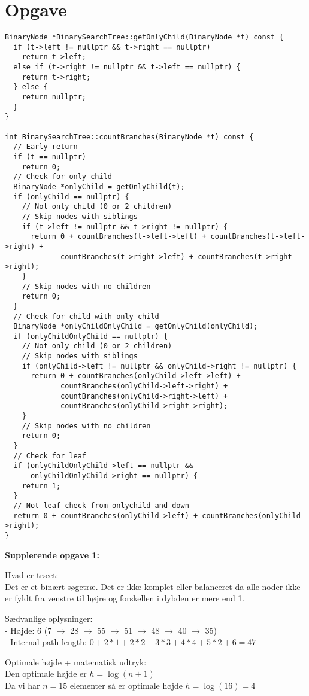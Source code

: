 \documentclass{article}
\begin{document}
\section{Opgave} %
\begin{verbatim}
BinaryNode *BinarySearchTree::getOnlyChild(BinaryNode *t) const {
  if (t->left != nullptr && t->right == nullptr)
    return t->left;
  else if (t->right != nullptr && t->left == nullptr) {
    return t->right;
  } else {
    return nullptr;
  }
}

int BinarySearchTree::countBranches(BinaryNode *t) const {
  // Early return
  if (t == nullptr)
    return 0;
  // Check for only child
  BinaryNode *onlyChild = getOnlyChild(t);
  if (onlyChild == nullptr) {
    // Not only child (0 or 2 children)
    // Skip nodes with siblings
    if (t->left != nullptr && t->right != nullptr) {
      return 0 + countBranches(t->left->left) + countBranches(t->left->right) +
             countBranches(t->right->left) + countBranches(t->right->right);
    }
    // Skip nodes with no children
    return 0;
  }
  // Check for child with only child
  BinaryNode *onlyChildOnlyChild = getOnlyChild(onlyChild);
  if (onlyChildOnlyChild == nullptr) {
    // Not only child (0 or 2 children)
    // Skip nodes with siblings
    if (onlyChild->left != nullptr && onlyChild->right != nullptr) {
      return 0 + countBranches(onlyChild->left->left) +
             countBranches(onlyChild->left->right) +
             countBranches(onlyChild->right->left) +
             countBranches(onlyChild->right->right);
    }
    // Skip nodes with no children
    return 0;
  }
  // Check for leaf
  if (onlyChildOnlyChild->left == nullptr &&
      onlyChildOnlyChild->right == nullptr) {
    return 1;
  }
  // Not leaf check from onlychild and down
  return 0 + countBranches(onlyChild->left) + countBranches(onlyChild->right);
}
\end{verbatim}

\textbf{Supplerende opgave 1:}

Hvad er træet:\\
Det er et binært søgetræ. Det er ikke komplet eller balanceret da 
alle noder ikke er fyldt fra venstre til højre og forskellen i dybden er 
mere end 1.

Sædvanlige oplysninger:\\
- Højde: 6 (7 $\to$ 28 $\to$ 55 $\to$ 51 $\to$ 48 $\to$ 40 $\to$ 35)\\
- Internal path length: $0 + 2 * 1 + 2 * 2 + 3 * 3 + 4 * 4 + 5 * 2 + 6 = 47$


Optimale højde + matematisk udtryk:\\
Den optimale højde er $h = \log{(n + 1)}$\\
Da vi har $n=15$ elementer så er optimale højde $h = \log{(16)}=4$
\end{document}
